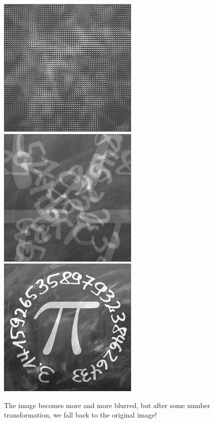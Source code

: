 \documentclass[11pt,class=report,crop=false]{standalone}
\begin{document}
\begin{cours}
\begin{center}
\includegraphics[scale=\myscale,scale=0.3]{images_chapter/pi_gimp_new_photo_6.png}\qquad
\includegraphics[scale=\myscale,scale=0.3]{images_chapter/pi_gimp_new_photo_7.png}\qquad
\includegraphics[scale=\myscale,scale=0.3]{images_chapter/pi_gimp_new_photo_8.png}
\end{center}
The image becomes more and more blurred, but after some number transformation, we fall back to the original image!
\end{cours}




\end{document}
